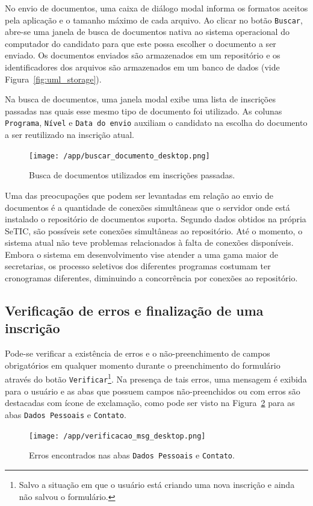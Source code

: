 \documentclass[
  10.5pt,				  %
	openright,			%
	twoside,			  %
  a5paper,
  chapter=TITLE,	%
	section=TITLE,	%
  hyphens,        %
	english,        %
	brazil          %
]{abntex2}
\begin{document}
No envio de documentos, uma caixa de diálogo modal informa os formatos aceitos pela aplicação e o tamanho máximo de cada arquivo. Ao clicar no botão \texttt{Buscar}, abre-se uma janela de busca de documentos nativa ao sistema operacional do computador do candidato para que este possa escolher o documento a ser enviado. Os documentos enviados são armazenados em um repositório e os identificadores dos arquivos são armazenados em um banco de dados (vide Figura~\ref{fig:uml_storage}).

Na busca de documentos, uma janela modal exibe uma lista de inscrições passadas nas quais esse mesmo tipo de documento foi utilizado. As colunas \texttt{Programa}, \texttt{Nível} e \texttt{Data do envio} auxiliam o candidato na escolha do documento a ser reutilizado na inscrição atual.

\begin{figure}[!ht]
  \caption{\label{fig:buscar_documento_desktop} Busca de documentos utilizados em inscrições passadas.}
  \begin{center}
    \texttt{[image: /app/buscar\_documento\_desktop.png]}
  \end{center}
\end{figure}


Uma das preocupações que podem ser levantadas em relação ao envio de documentos é a quantidade de conexões simultâneas que o servidor onde está instalado o repositório de documentos suporta. Segundo dados obtidos na própria SeTIC, são possíveis sete conexões simultâneas ao repositório. Até o momento, o sistema atual não teve problemas relacionados à falta de conexões disponíveis. Embora o sistema em desenvolvimento vise atender a uma gama maior de secretarias, os processo seletivos dos diferentes programas costumam ter cronogramas diferentes, diminuindo a concorrência por conexões ao repositório.


\subsection{Verificação de erros e finalização de uma inscrição}\label{sec:validacao}

Pode-se verificar a existência de erros e o não-preenchimento de campos obrigatórios em qualquer momento durante o preenchimento do formulário através do botão \texttt{Verificar}\footnote{Salvo a situação em que o usuário está criando uma nova inscrição e ainda não salvou o formulário.}.
%
Na presença de tais erros, uma mensagem é exibida para o usuário e as abas que possuem campos não-preenchidos ou com erros são destacadas com ícone de exclamação, como pode ser visto na Figura~\ref{fig:verificacao_msg} para as abas \texttt{Dados Pessoais} e \texttt{Contato}.
%
\begin{figure}[!ht]
  \caption{\label{fig:verificacao_msg} Erros encontrados nas abas \texttt{Dados Pessoais} e \texttt{Contato}.}
  \begin{center}
    \texttt{[image: /app/verificacao\_msg\_desktop.png]}
  \end{center}
\end{figure}
\end{document}
